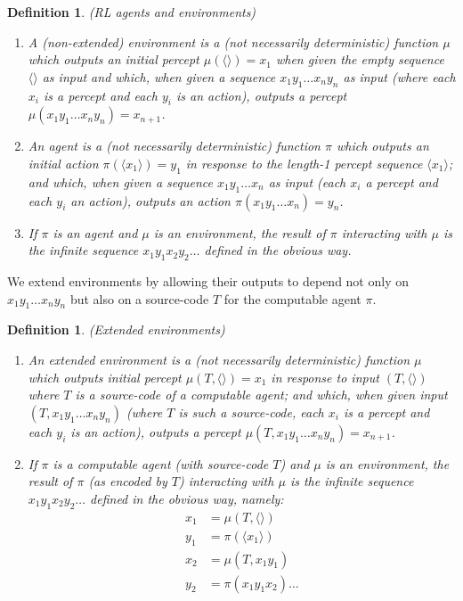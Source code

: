 \documentclass{article}
\newtheorem{mydefinition}[mytheorem]{Definition}
\begin{document}
\begin{mydefinition}
\label{agentenvironmentdefn}
(RL agents and environments)
  \begin{enumerate}
    \item
    A (non-extended) \emph{environment} is a (not necessarily
    deterministic) function $\mu$ which outputs an initial
    percept $\mu(\langle\rangle)=x_1$ when given the empty sequence $\langle\rangle$
    as input
    and which, when given a sequence $x_1y_1\ldots x_ny_n$
    as input (where each $x_i$ is a percept and each
    $y_i$ is an action), outputs a percept
    $\mu(x_1y_1\ldots x_ny_n)=x_{n+1}$.
    \item
    An \emph{agent} is a (not necessarily deterministic)
    function $\pi$ which outputs an initial action $\pi(\langle x_1\rangle)=y_1$
    in response to the length-1 percept sequence $\langle x_1\rangle$;
    and which, when given a sequence $x_1y_1\ldots x_n$ as input
    (each $x_i$ a percept and each $y_i$ an action),
    outputs an action $\pi(x_1y_1\ldots x_n)=y_n$.
    \item
    If $\pi$ is an agent and $\mu$ is an environment, the \emph{result of
    $\pi$ interacting with $\mu$} is the infinite sequence
    $x_1y_1x_2y_2\ldots$ defined in the obvious way.
  \end{enumerate}
\end{mydefinition}

We extend environments by allowing their outputs to depend not only on
$x_1y_1\ldots x_ny_n$ but also on a source-code $T$ for the computable agent $\pi$.

\begin{mydefinition}
\label{extendedenvironmentsdefn}
(Extended environments)
\begin{enumerate}
  \item
  An \emph{extended environment} is a (not necessarily deterministic)
  function $\mu$ which outputs initial percept $\mu(T,\langle\rangle)=x_1$
  in response to input $(T,\langle\rangle)$ where $T$ is a source-code of a
  computable agent; and which, when given input $(T,x_1y_1\ldots x_ny_n)$ (where
  $T$ is such a source-code, each $x_i$ is a percept and each $y_i$ is
  an action), outputs a percept $\mu(T,x_1y_1\ldots x_ny_n)=x_{n+1}$.
  \item
  If $\pi$ is a computable agent (with source-code $T$)
  and $\mu$ is an environment, the \emph{result of $\pi$ (as encoded by $T$)
  interacting with $\mu$} is the infinite sequence $x_1y_1x_2y_2\ldots$ defined in
  the obvious way, namely:
  \begin{align*}
    x_1 &= \mu(T,\langle\rangle)\\
    y_1 &= \pi(\langle x_1\rangle)\\
    x_2 &= \mu(T,x_1y_1)\\
    y_2 &= \pi(x_1y_1x_2) \ldots
  \end{align*}
\end{enumerate}
\end{mydefinition}
\end{document}
